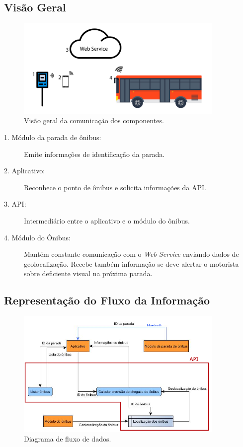 \documentclass[
	12pt,				%
	oneside,			%
	a4paper,			%
	brazil				%
]{abntex2}
\begin{document}
\subsection{Visão Geral}

\begin{figure}[!h]
\centering
\includegraphics[width=10cm, center]{images/relations_system.jpg}
\caption{Visão geral da comunicação dos componentes.}
\label{Rotulo}
\end{figure}

\begin{description}
\item[1. Módulo da parada de ônibus:] Emite informações de identificação da parada.

\item[2. Aplicativo:] Reconhece o ponto de ônibus e solicita informações da API.

\item[3. API:] Intermediário entre o aplicativo e o módulo do ônibus.

\item[4. Módulo do Ônibus:] Mantém constante comunicação com o \textit{Web Service} enviando dados de geolocalização. Recebe também informação se deve alertar o motorista sobre deficiente visual na próxima parada.
\end{description}

\newpage

\subsection{Representação do Fluxo da Informação}

\begin{figure}[!h]
\centering
\includegraphics[width=10cm, center]{images/data-flux.png}
\caption{Diagrama de fluxo de dados.}
\label{Rotulo}
\end{figure}
\end{document}
